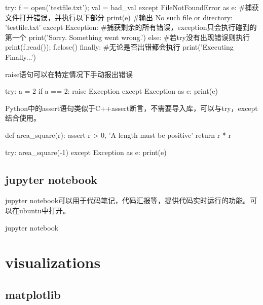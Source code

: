 \documentclass{article}
\begin{document}
      \begin{codeblock}[language=python, caption={try except}]
        try:
            f = open('testfile.txt'); val = bad_val
        except FileNotFoundError as e: #捕获文件打开错误，并执行以下部分
            print(e) #输出 No such file or directory: 'testfile.txt'
        except Exception: #捕获剩余的所有错误，exception只会执行碰到的第一个
            print('Sorry. Something went wrong.')
        else: #若try没有出现错误则执行
            print(f.read()); f.close()
        finally: #无论是否出错都会执行
            print('Executing Finally...')
      \end{codeblock}

      raise语句可以在特定情况下手动报出错误
      \begin{codeblock}[language=python, caption={Raise an error}]
        try:
            a = 2
            if a == 2:
                raise Exception
        except Exception as e:
            print(e)
      \end{codeblock}

      Python中的assert语句类似于C++assert断言，不需要导入库，可以与try，except结合使用。
      \begin{codeblock}[language=python, caption={assert in python}]
        def area_square(r):
            assert r > 0, 'A length must be positive'
            return r * r

        try:
            area_square(-1)
        except Exception as e:
            print(e)
      \end{codeblock}

    \subsection{jupyter notebook}
      jupyter notebook可以用于代码笔记，代码汇报等，提供代码实时运行的功能。可以在ubuntu中打开。
      \begin{codeblock}[language=bash, caption={run jupyter notebok}]
        jupyter notebook
      \end{codeblock}

  \section{visualizations}

    \subsection{matplotlib}
\end{document}
